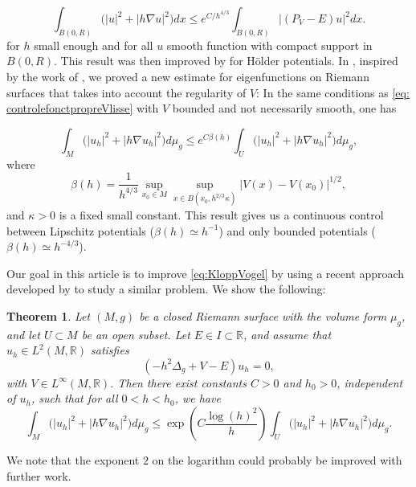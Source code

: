 \documentclass[leqno,11pt,letterpaper, english]{amsart}
\theoremstyle{plain}
\newtheorem{thm}{Theorem}
\theoremstyle{definition}
\numberwithin{equation}{section}
\def\R{\mathbb R}
\begin{document}
	\begin{equation}
		\label{eq:KloppVogel}
		\int_{B(0, R)} \Big(|u|^2 + |h\nabla u|^2 \Big)dx \leq  e^{C/h^{4/3}} \int_{B(0, R)} |(P_V - E)u|^2dx.
	\end{equation}
	for  $h$ small enough and for all $u$ smooth function with compact support in $B(0,R)$. This result was then improved by \cite{vodevSemiclassicalResolventEstimates2020} for Hölder potentials.
	 In \cite{Campagne2026a}, inspired by the work of \cite{vodevSemiclassicalResolventEstimates2020},  we proved a new estimate for eigenfunctions on Riemann surfaces that takes into account the regularity of $V$: In the same conditions as \ref{eq: controlefonctpropreVlisse} with $V$ bounded and not necessarily smooth, one has

		\begin{equation}
			\int_M \Big( |u_h|^2 + |h\nabla u_h|^2 \Big)d\mu_g \leq  e^{C\beta(h)} \int_U\Big( |u_h|^2 + |h\nabla u_h|^2\Big)d\mu_g,
		\end{equation}
		where
		\begin{equation}
			\beta(h) = \frac{1}{h^{4/3}} \sup_{x_0 \in M} \sup_{x \in B(x_0, h^{2/3} \kappa)} |V(x) - V(x_0)|^{1/2},
		\end{equation}
		and $\kappa > 0$ is a fixed small constant.  This result gives us a continuous control between Lipschitz potentials ($\beta(h)\simeq h^{-1}$)  and only bounded potentials ($\beta(h)\simeq h^{-4/3}$).

	Our goal in this article is to improve \eqref{eq:KloppVogel} by using a recent approach developed by \cite* {logunov2020landisconjectureexponentialdecay} to study a similar problem. We show the following:

	\begin{thm}
		Let $(M,g)$ be a closed Riemann surface with the volume form $\mu_g$, and let $U \subset M$ be an open subset. Let $E \in I\subset \R$, and assume that $u_h \in L^2(M,\R)$ satisfies
		\[
		(-h^2\Delta_g +V- E)u_h = 0,
		\]
		with $V \in L^\infty(M, \R)$. Then there exist constants $C > 0$ and $h_0 > 0$, independent of $u_h$, such that for all $0 < h < h_0$, we have
		\begin{equation}
			\int_M \Big(|u_{h}|^2+ |h\nabla u_{h}|^2\Big)d\mu_g    \leq \exp\left( C \frac{\log(h)^{2}}{h} \right) \int_U \Big(|u_{h}|^2+ |h\nabla u_{h}|^2 \Big)d\mu_g.
		\end{equation}
	\end{thm}
We note that the exponent $2$ on the logarithm could probably be improved with further work. 
\end{document}
